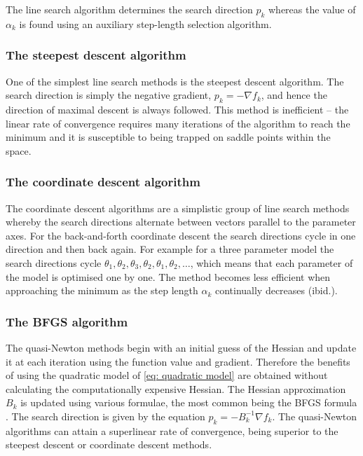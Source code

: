 \noindent  The line search algorithm determines the search direction $p_k$ whereas the value of $\alpha_k$ is found using an auxiliary step-length selection algorithm.


\subsubsection{The steepest descent algorithm}

One of the simplest line search methods is the steepest descent algorithm.
The search direction is simply the negative gradient, $p_k = -\nabla f_k$, and hence the direction of maximal descent is always followed.
This method is inefficient -- the linear rate of convergence requires many iterations of the algorithm to reach the minimum and it is susceptible to being trapped on saddle points within the space.


\subsubsection{The coordinate descent algorithm}

The coordinate descent algorithms are a simplistic group of line search methods whereby the search directions alternate between vectors parallel to the parameter axes.
For the back-and-forth coordinate descent the search directions cycle in one direction and then back again.
For example for a three parameter model the search directions cycle $\theta_1, \theta_2, \theta_3, \theta_2, \theta_1, \theta_2, \hdots$, which means that each parameter of the model is optimised one by one.
The method becomes less efficient when approaching the minimum as the step length $\alpha_k$ continually decreases (ibid.).


\subsubsection{The BFGS algorithm}

The quasi-Newton methods begin with an initial guess of the Hessian and update it at each iteration using the function value and gradient.
Therefore the benefits of using the quadratic model of \eqref{eq: quadratic model} are obtained without calculating the computationally expensive Hessian.
The Hessian approximation $B_k$ is updated using various formulae, the most common being the BFGS formula \citep{Broyden70,Fletcher70,Goldfarb70,Shanno70}.
The search direction is given by the equation $p_k = -B_k^{-1} \nabla f_k$.
The quasi-Newton algorithms can attain a superlinear rate of convergence, being superior to the steepest descent or coordinate descent methods.


